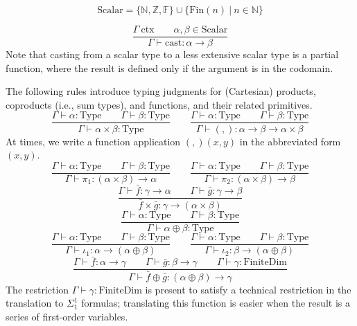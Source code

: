 \documentclass[11pt]{article}
\begin{document}
\begin{equation}
	\text{Scalar} = \{\mathbb{N}, \mathbb{Z}, \mathbb{F}\} \cup \{\text{Fin}(n)\ |\ n \in \mathbb{N}\}
\end{equation}

\begin{equation}
	\frac{\Gamma\ \text{ctx} \qquad \alpha, \beta \in \text{Scalar}}
	{\Gamma \vdash \text{cast} : \alpha \to \beta}
\end{equation}
Note that casting from a scalar type to a less extensive scalar type
is a partial function, where the result is defined only if the argument is
in the codomain.

The following rules introduce typing judgments for (Cartesian) products,
coproducts (i.e., sum types), and functions, and their related primitives.
\begin{equation}
	\frac{\Gamma \vdash \alpha : \text{Type}
	\qquad \Gamma \vdash \beta : \text{Type}}
	{\Gamma \vdash \alpha \times \beta : \text{Type}}
	\qquad
	\frac{\Gamma \vdash \alpha : \text{Type}
	\qquad \Gamma \vdash \beta : \text{Type}}
	{\Gamma \vdash (,) : \alpha \to \beta \to \alpha \times \beta}
\end{equation}
At times, we write a function application $(,)(x, y)$
in the abbreviated form $(x,y)$.
\begin{equation}
	\frac{\Gamma \vdash \alpha : \text{Type}
	\qquad \Gamma \vdash \beta : \text{Type}}
	{\Gamma \vdash \pi_1 : (\alpha \times \beta) \to \alpha}
	\qquad
	\frac{\Gamma \vdash \alpha : \text{Type}
	\qquad \Gamma \vdash \beta : \text{Type}}
	{\Gamma \vdash \pi_2 : (\alpha \times \beta) \to \beta}
\end{equation}
\begin{equation}
	\frac{\Gamma \vdash \bar{f} : \gamma \to \alpha
	\qquad \Gamma \vdash \bar{g} : \gamma \to \beta}
	{\bar{f} \times \bar{g} : \gamma \to (\alpha \times \beta)}
\end{equation}
\begin{equation}
	\frac{\Gamma \vdash \alpha : \text{Type}
	\qquad \Gamma \vdash \beta : \text{Type}}
	{\Gamma \vdash \alpha \oplus \beta : \text{Type}}
\end{equation}
\begin{equation}
	\frac{\Gamma \vdash \alpha : \text{Type}
	\qquad \Gamma \vdash \beta : \text{Type}}
	{\Gamma \vdash \iota_1 : \alpha \to (\alpha \oplus \beta)}
	\qquad
	\frac{\Gamma \vdash \alpha : \text{Type}
	\qquad \Gamma \vdash \beta : \text{Type}}
	{\Gamma \vdash \iota_2 : \beta \to (\alpha \oplus \beta)}
\end{equation}
\begin{equation}
	\frac{\Gamma \vdash \bar{f} : \alpha \to \gamma
	\qquad \Gamma \vdash \bar{g} : \beta \to \gamma
	\qquad \Gamma \vdash \gamma : \text{FiniteDim}}
	{\Gamma \vdash \bar{f} \oplus \bar{g} : (\alpha \oplus \beta) \to \gamma}
\end{equation}
The restriction $\Gamma \vdash \gamma : \text{FiniteDim}$ is present to
satisfy a technical restriction in the translation to $\Sigma^1_1$ formulas;
translating this function is easier when the result is a series
of first-order variables.
\end{document}
